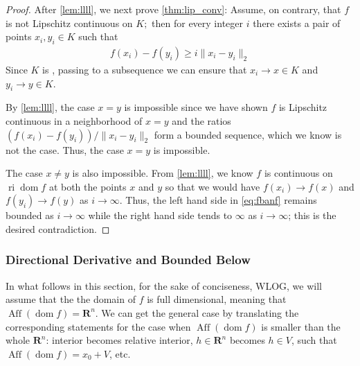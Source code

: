 \documentclass{article}
\newcommand{\ri}{\operatorname{ri}}
\newcommand{\Aff}{\operatorname{Aff}}
\newcommand{\dom}{\operatorname{dom}}
\begin{document}
\begin{proof}
After \cref{lem:llll}, we next prove \cref{thm:lip_conv}: 
Assume, on contrary, that $f$ is not Lipschitz continuous on $K ;$ then for every integer $i$ there exists a pair of points $x_{i}, y_{i} \in K$ such that
\begin{align}
f\left(x_{i}\right)-f\left(y_{i}\right) \geq i\|x_{i}-y_{i}\|_2\label{eq:fbanf}
\end{align}
Since $K$ is , passing to a subsequence we can ensure that $x_{i} \rightarrow x \in K$ and $y_{i} \rightarrow y \in K$. 

By \cref{lem:llll}, the case $x=y$ is impossible since we have shown $f$ is Lipschitz continuous in a neighborhood of $x=y$ and the ratios $\left(f\left(x_{i}\right)-f\left(y_{i}\right)\right) /\|x_{i}-y_{i}\|_2$ form a bounded sequence, which we know is not the case. Thus, the case $x=y$ is impossible. 

The case $x \neq y$ is also impossible. From \cref{lem:llll}, we know $f$ is continuous on  $\ri \dom f$ at both the points $x$ and $y$ so that we would have $f\left(x_{i}\right) \rightarrow f(x)$ and $f\left(y_{i}\right) \rightarrow f(y)$ as $i \rightarrow \infty$. Thus, the left hand side in \cref{eq:fbanf} remains bounded as $i \rightarrow \infty$ while the right hand side tends to $\infty$ as $i \rightarrow \infty$; this is the desired contradiction.
\end{proof} 

\subsubsection{Directional Derivative and  Bounded Below}
In what follows in this section, for the sake of conciseness, WLOG, we will assume that the the domain of $f$ is full dimensional, meaning that  $\Aff(\dom f)=\mathbf{R}^{n}$. We can get the general case by translating the corresponding statements for the case when $\Aff(\dom f)$ is smaller than the whole $\mathbf{R}^{n}$: interior becomes relative interior, $h \in \mathbf{R}^{n}$ becomes $h \in V$, such that $\Aff(\dom f)=x_0+V$, etc.
\end{document}
